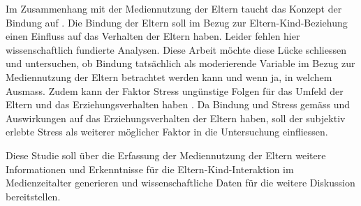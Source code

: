 Im Zusammenhang mit der Mediennutzung der Eltern taucht das Konzept der Bindung auf \cite{Prekop2017, Weber2017, Blikk2017}. Die Bindung der Eltern soll im Bezug zur Eltern-Kind-Beziehung einen Einfluss auf das Verhalten der Eltern haben. Leider fehlen hier wissenschaftlich fundierte Analysen. Diese Arbeit möchte diese Lücke schliessen und untersuchen, ob Bindung tatsächlich als moderierende Variable im Bezug zur Mediennutzung der Eltern betrachtet werden kann und wenn ja, in welchem Ausmass. Zudem kann der Faktor Stress ungünstige Folgen für das Umfeld der Eltern und das Erziehungsverhalten haben \cite{Cina2009}. Da Bindung und Stress gemäss  und  Auswirkungen auf das Erziehungsverhalten der Eltern haben, soll der subjektiv erlebte Stress als weiterer möglicher Faktor in die Untersuchung einfliessen.  

Diese Studie soll über die Erfassung der Mediennutzung der Eltern weitere Informationen und Erkenntnisse für die Eltern-Kind-Interaktion im Medienzeitalter generieren und wissenschaftliche Daten für die weitere Diskussion bereitstellen.




